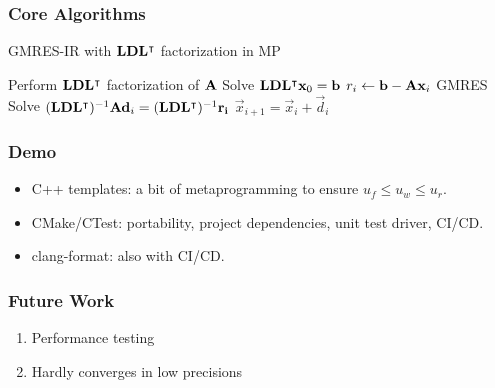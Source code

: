 \documentclass[t,12pt,numbers,fleqn]{beamer}
\begin{document}
\begin{frame}
\frametitle{Core Algorithms}

  \begin{algorithm}[H]
    \caption{GMRES-IR with \(\mathbf{L}\mathbf{D}\mathbf{L}^\intercal\) factorization in MP}
    \begin{algorithmic}[1]
      \State Perform \(\mathbf{L}\mathbf{D}\mathbf{L}^\intercal\) factorization of \(\mathbf{A}\) 
      \State Solve \(\mathbf{L}\mathbf{D}\mathbf{L}^\intercal \mathbf{x}_0 = \mathbf{b}\) 
      \State \(r_i \gets \mathbf{b} - \mathbf{A}\mathbf{x}_i\) 
      \State GMRES Solve \((\mathbf{L}\mathbf{D}\mathbf{L}^\intercal)^{-1}\mathbf{A}\mathbf{d}_i = (\mathbf{L}\mathbf{D}\mathbf{L}^\intercal)^{-1}\mathbf{r_i}\) 
      \State \(\vec{x}_{i + 1} = \vec{x}_i + \vec{d}_i\) 
      \EndFor
    \end{algorithmic}
  \end{algorithm}
\end{frame}


\begin{frame}
\frametitle{Demo}

\begin{itemize}
\item C++ templates: a bit of metaprogramming to ensure \(u_f \leq u_w \leq u_r\).
\item CMake/CTest: portability, project dependencies, unit test driver, CI/CD.
\item clang-format: also with CI/CD.
\end{itemize}

\end{frame}


\begin{frame}
\frametitle{Future Work}

\begin{enumerate}
\item Performance testing
\item Hardly converges in low precisions
\end{enumerate}

\end{frame}
\end{document}
